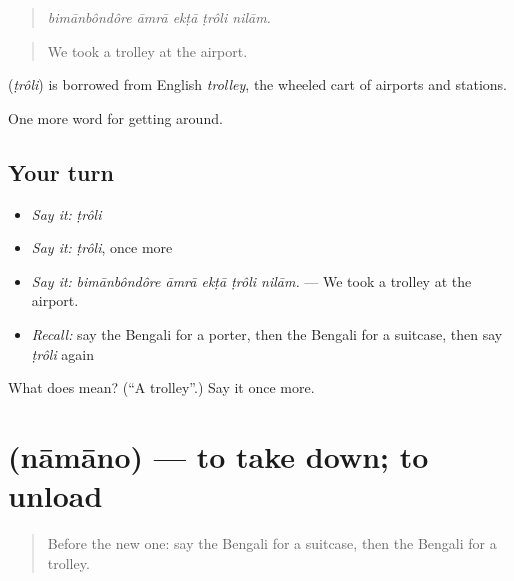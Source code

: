 \begin{quote}
    
\end{quote}

\begin{quote}
\emph{bimānbôndôre āmrā ekṭā ṭrôli nilām.}
\end{quote}

\begin{quote}
We took a trolley at the airport.
\end{quote}

\begin{cousinweb}
\textbf{} (\emph{ṭrôli}) is borrowed from English \emph{trolley}, the wheeled cart of airports and stations.
\end{cousinweb}

\begin{grammarlens}[title={What you've built}]
One more word for getting around.
\end{grammarlens}

\subsection*{Your turn}
\begin{itemize}
\raggedright
  \item \emph{Say it:} \emph{ṭrôli}
  \item \emph{Say it:} \emph{ṭrôli}, once more
  \item \emph{Say it:} \emph{bimānbôndôre āmrā ekṭā ṭrôli nilām.} — We took a trolley at the airport.
  \item \emph{Recall:} say the Bengali for a porter, then the Bengali for a suitcase, then say \emph{ṭrôli} again
\end{itemize}

\begin{tcolorbox}[breakable,colback=teal!4,colframe=teal!35!black,title={Before you move on}]
What does  mean? (\textquotedblleft{}A trolley\textquotedblright{}.) Say it once more.
\end{tcolorbox}
\section[\texorpdfstring{\bn{নামানো} (nāmāno)}{নামানো (nāmāno)}]{ (nāmāno) — to take down; to unload}

\label{lesson:BN-C386-namano}



\begin{quote}
Before the new one: say the Bengali for a suitcase, then the Bengali for a trolley.
\end{quote}

